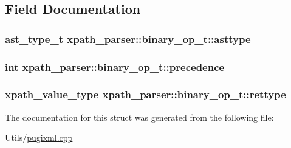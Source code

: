 \subsection{Field Documentation}
\hypertarget{structxpath__parser_1_1binary__op__t_1af7e302de46bf45ffdb466cfd89fa15}{
\subsubsection[asttype]{\setlength{\rightskip}{0pt plus 5cm}\hyperlink{pugixml_8cpp_11258a240266b84b6b0526930e5d330d}{ast\_\-type\_\-t} \hyperlink{structxpath__parser_1_1binary__op__t_1af7e302de46bf45ffdb466cfd89fa15}{xpath\_\-parser::binary\_\-op\_\-t::asttype}}}
\label{structxpath__parser_1_1binary__op__t_1af7e302de46bf45ffdb466cfd89fa15}


\hypertarget{structxpath__parser_1_1binary__op__t_422064e11cc65c6110c422568441b69c}{
\subsubsection[precedence]{\setlength{\rightskip}{0pt plus 5cm}int \hyperlink{structxpath__parser_1_1binary__op__t_422064e11cc65c6110c422568441b69c}{xpath\_\-parser::binary\_\-op\_\-t::precedence}}}
\label{structxpath__parser_1_1binary__op__t_422064e11cc65c6110c422568441b69c}


\hypertarget{structxpath__parser_1_1binary__op__t_02c18d8d6d9a7ef28b2fefcb900e75bc}{
\subsubsection[rettype]{\setlength{\rightskip}{0pt plus 5cm}xpath\_\-value\_\-type \hyperlink{structxpath__parser_1_1binary__op__t_02c18d8d6d9a7ef28b2fefcb900e75bc}{xpath\_\-parser::binary\_\-op\_\-t::rettype}}}
\label{structxpath__parser_1_1binary__op__t_02c18d8d6d9a7ef28b2fefcb900e75bc}




The documentation for this struct was generated from the following file:\begin{CompactItemize}
\item 
Utils/\hyperlink{pugixml_8cpp}{pugixml.cpp}\end{CompactItemize}

